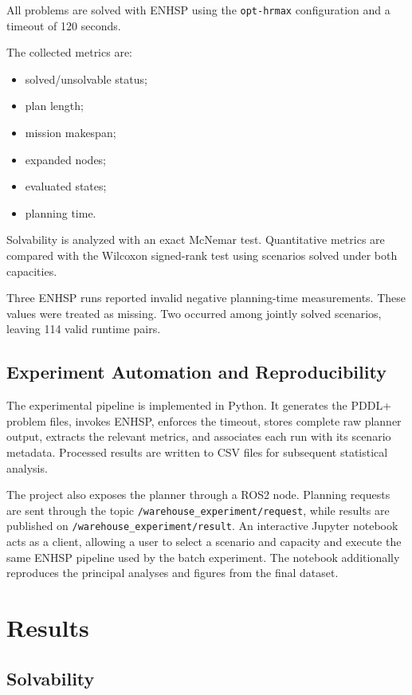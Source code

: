 \documentclass[conference]{IEEEtran}
\begin{document}
All problems are solved with ENHSP using the \texttt{opt-hrmax}
configuration and a timeout of 120 seconds.

The collected metrics are:
\begin{itemize}
    \item solved/unsolvable status;
    \item plan length;
    \item mission makespan;
    \item expanded nodes;
    \item evaluated states;
    \item planning time.
\end{itemize}

Solvability is analyzed with an exact McNemar test. Quantitative metrics are
compared with the Wilcoxon signed-rank test using scenarios solved under both
capacities.

Three ENHSP runs reported invalid negative planning-time measurements. These
values were treated as missing. Two occurred among jointly solved scenarios,
leaving 114 valid runtime pairs.

\subsection{Experiment Automation and Reproducibility}

The experimental pipeline is implemented in Python. It generates the PDDL+
problem files, invokes ENHSP, enforces the timeout, stores complete raw planner
output, extracts the relevant metrics, and associates each run with its
scenario metadata. Processed results are written to CSV files for subsequent
statistical analysis.

The project also exposes the planner through a ROS2 node. Planning requests
are sent through the topic \texttt{/warehouse\_experiment/request}, while
results are published on \texttt{/warehouse\_experiment/result}. An
interactive Jupyter notebook acts as a client, allowing a user to select a
scenario and capacity and execute the same ENHSP pipeline used by the batch
experiment. The notebook additionally reproduces the principal analyses and
figures from the final dataset.

\section{Results}

\subsection{Solvability}
\end{document}
